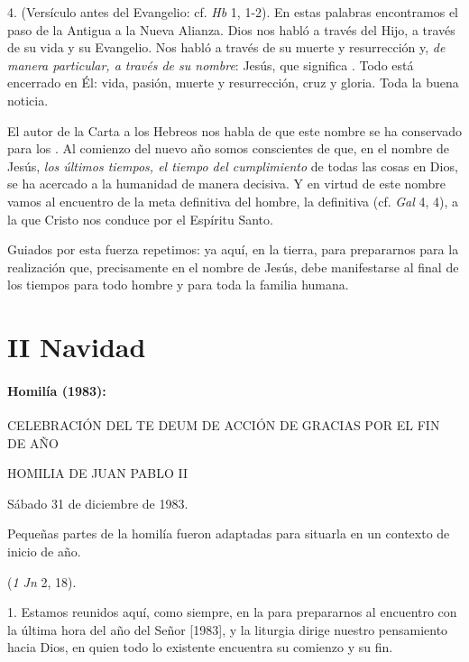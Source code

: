 \begin{body}
	4.  (Versículo antes del Evangelio: cf. \emph{Hb} 1, 1-2). En estas palabras encontramos el paso de la Antigua a la Nueva Alianza. Dios nos habló a través del Hijo, a través de su vida y su Evangelio. Nos habló a través de su muerte y resurrección y, \emph{de manera particular, a través de su nombre}: Jesús, que significa . Todo está encerrado en Él: vida, pasión, muerte y resurrección, cruz y gloria. Toda la buena noticia.

	El autor de la Carta a los Hebreos nos habla de que este nombre se ha conservado para los . Al comienzo del nuevo año somos conscientes de que, en el nombre de Jesús, \emph{los últimos tiempos, el tiempo del cumplimiento} de todas las cosas en Dios, se ha acercado a la humanidad de manera decisiva. Y en virtud de este nombre vamos al encuentro de la meta definitiva del hombre, la definitiva  (cf. \emph{Gal} 4, 4), a la que Cristo nos conduce por el Espíritu Santo.

	Guiados por esta fuerza repetimos:  ya aquí, en la tierra, para prepararnos para la realización que, precisamente en el nombre de Jesús, debe manifestarse al final de los tiempos para todo hombre y para toda la familia humana.



	\chapter{II Navidad}

	\subsubsection{Homilía (1983):}

	CELEBRACIÓN DEL TE DEUM DE ACCIÓN DE GRACIAS POR EL FIN DE AÑO

	HOMILIA DE JUAN PABLO II

	Sábado 31 de diciembre de 1983.

	Pequeñas partes de la homilía fueron adaptadas para situarla en un contexto de inicio de año.

	 (\emph{1 Jn} 2, 18).

	1. Estamos reunidos aquí, como siempre, en la  para prepararnos al encuentro con la última hora del año del Señor {[}1983{]}, y la liturgia dirige nuestro pensamiento hacia Dios, en quien todo lo existente encuentra su comienzo y su fin.


\end{body}
